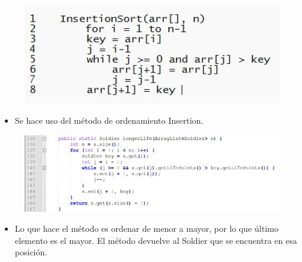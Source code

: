 \documentclass{article}
\begin{document}
	\begin{figure}[H]
		\centering
		\includegraphics[width=1\textwidth,keepaspectratio]{img/insertion.jpg}
	\end{figure}
	
		
	\begin{itemize}	
		\item Se hace uso del método de ordenamiento Insertion.
	\end{itemize}
	
	\begin{figure}[H]
		\centering
		\includegraphics[width=1\textwidth,keepaspectratio]{img/6.jpg}
	\end{figure}
	
	\begin{itemize}	
		\item Lo que hace el método es ordenar de menor a mayor, por lo que último elemento es el mayor. El método devuelve al Soldier que se encuentra en esa posición.
	\end{itemize}
	
\end{document}
